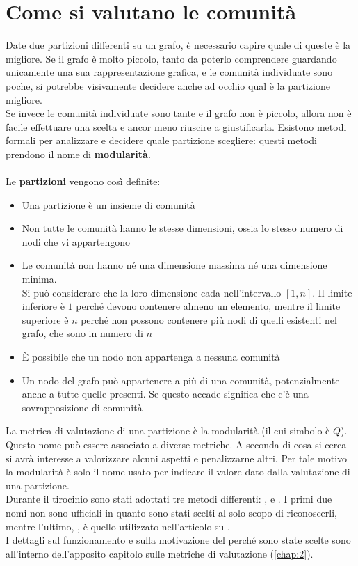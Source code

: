 \section{Come si valutano le comunità}
Date due partizioni differenti su un grafo, è necessario capire quale di queste è la migliore. Se il grafo è molto piccolo, tanto da poterlo comprendere guardando unicamente una sua rappresentazione grafica, e le comunità individuate sono poche, si potrebbe visivamente decidere anche ad occhio qual è la partizione migliore.\\
Se invece le comunità individuate sono tante e il grafo non è piccolo, allora non è facile effettuare una scelta e ancor meno riuscire a giustificarla. Esistono metodi formali per analizzare e decidere quale partizione scegliere: questi metodi prendono il nome di \textbf{modularità}.\\
\\
Le \textbf{partizioni} vengono così definite:
\begin{itemize}
	\item Una partizione è un insieme di comunità
	\item Non tutte le comunità hanno le stesse dimensioni, ossia lo stesso numero di nodi che vi appartengono
	\item Le comunità non hanno né una dimensione massima né una dimensione minima.\\
	Si può considerare che la loro dimensione cada nell'intervallo $[1, n]$. Il limite inferiore è $1$ perché devono contenere almeno un elemento, mentre il limite superiore è $n$ perché non possono contenere più nodi di quelli esistenti nel grafo, che sono in numero di $n$
	\item È possibile che un nodo non appartenga a nessuna comunità
	\item Un nodo del grafo può appartenere a più di una comunità, potenzialmente anche a tutte quelle presenti. Se questo accade significa che c'è una sovrapposizione di comunità
\end{itemize}
La metrica di valutazione di una partizione è la modularità (il cui simbolo è $Q$). Questo nome può essere associato a diverse metriche. A seconda di cosa si cerca si avrà interesse a valorizzare alcuni aspetti e penalizzarne altri. Per tale motivo la modularità è solo il nome usato per indicare il valore dato dalla valutazione di una partizione.\\
Durante il tirocinio sono stati adottati tre metodi differenti: \textbf{\mmax}, \textbf{\mover} e \textbf{\mmod}. I primi due nomi non sono ufficiali in quanto sono stati scelti al solo scopo di riconoscerli, mentre l'ultimo, \mmod , è quello utilizzato nell'articolo su \cnrl \cite{CNRL_paper}.\\
I dettagli sul funzionamento e sulla motivazione del perché sono state scelte sono all'interno dell'apposito capitolo sulle metriche di valutazione (\autoref{chap:2}).
%

